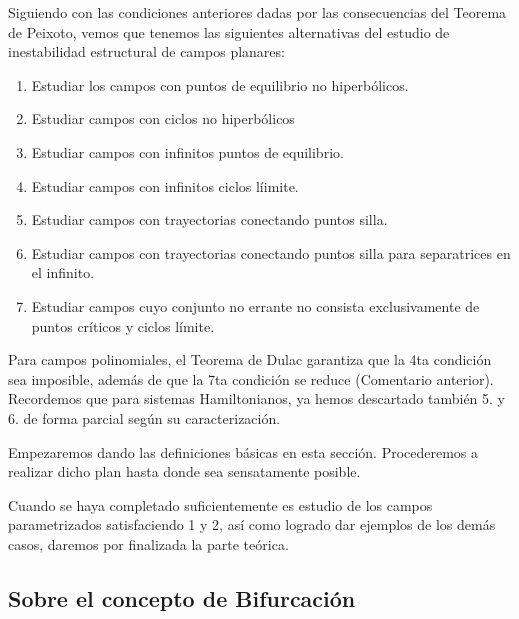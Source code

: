Siguiendo con las condiciones anteriores dadas por las consecuencias del Teorema de Peixoto, vemos que tenemos las siguientes alternativas del estudio de inestabilidad estructural de campos planares:

\begin{enumerate}
	\item Estudiar los campos con puntos de equilibrio no hiperbólicos.
	
	\item Estudiar campos con ciclos no hiperbólicos
	
	\item Estudiar campos con infinitos puntos de equilibrio.
	
	\item Estudiar campos con infinitos ciclos líimite.
	
	\item Estudiar campos con trayectorias conectando puntos silla.
	
	\item Estudiar campos con trayectorias conectando puntos silla para separatrices en el infinito.
	
	\item Estudiar campos cuyo conjunto no errante no consista exclusivamente de puntos críticos y ciclos límite.
\end{enumerate}

Para campos polinomiales, el Teorema de Dulac garantiza que  la 4ta condición sea imposible, además de que la 7ta condición se reduce (Comentario anterior). Recordemos que para sistemas Hamiltonianos, ya hemos descartado también 5. y 6. de forma parcial según su caracterización.

Empezaremos dando las definiciones básicas  en esta sección. Procederemos a realizar dicho plan hasta donde sea sensatamente posible.

Cuando se haya completado suficientemente es estudio de los campos parametrizados satisfaciendo 1 y 2, así como logrado dar ejemplos de los demás casos, daremos por finalizada la parte teórica. 

\subsection{Sobre el concepto de Bifurcación}


